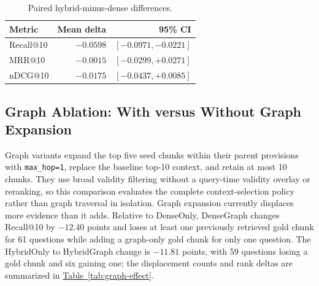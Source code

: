 \begin{table}[t]
\centering
\scriptsize
\caption{Dense versus hybrid retrieval. Retrieval values use 400 answerable
questions; latency percentiles use all 500 cases. The fallback column is the
fraction of 100 unanswerable outputs containing the family-specific Vietnamese
fallback phrase.}
\label{tab:dense-hybrid-results}
\end{table}

\begin{table}[t]
\centering
\scriptsize
\caption{Paired hybrid-minus-dense differences.}
\label{tab:dense-hybrid-paired}
\begin{tabular}{lrr}
\toprule
\textbf{Metric} & \textbf{Mean delta} & \textbf{95\% CI} \\
\midrule
Recall@10 & $-0.0598$ & $[-0.0971,-0.0221]$ \\
MRR@10 & $-0.0015$ & $[-0.0299,+0.0271]$ \\
nDCG@10 & $-0.0175$ & $[-0.0437,+0.0085]$ \\
\bottomrule
\end{tabular}
\end{table}

\subsection{Graph Ablation: With versus Without Graph Expansion}
\label{sec:ablation-graph}

Graph variants expand the top five seed chunks within their parent provisions
with \texttt{max\_hop=1}, replace the baseline top-10 context, and retain at
most 10 chunks. They use broad validity filtering without a query-time
validity overlay or reranking, so this comparison evaluates the complete
context-selection policy rather than graph traversal in isolation. Graph
expansion currently displaces more evidence than it adds.
Relative to DenseOnly, DenseGraph changes Recall@10 by $-12.40$ points and
loses at least one previously retrieved gold chunk for 61 questions while
adding a graph-only gold chunk for only one question. The HybridOnly to
HybridGraph change is $-11.81$ points, with 59 questions losing a gold chunk
and six gaining one; the displacement counts and rank deltas are summarized in
\hyperref[tab:graph-effect]{Table~\ref*{tab:graph-effect}}.

